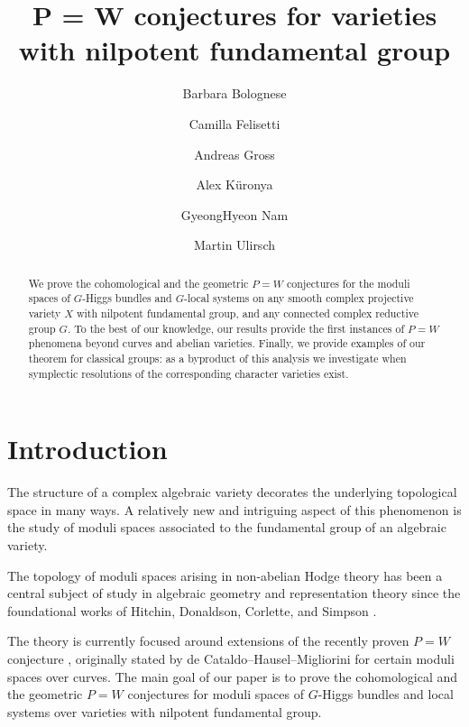 \documentclass[11pt, a4paper]{amsart}
\title{P = W conjectures for varieties with nilpotent fundamental group}
\date{}
\author{Barbara Bolognese}
\author{Camilla Felisetti}
\author{Andreas Gross}
\author{Alex K\"uronya}
\author{GyeongHyeon Nam}
\author{Martin Ulirsch}
\theoremstyle{definition}
\theoremstyle{myitemstyle}
\begin{document}
\begin{abstract}
 We prove the cohomological and the geometric $P=W$ conjectures for the moduli spaces of $G$-Higgs bundles and $G$-local systems on any smooth complex projective variety $X$ with nilpotent fundamental group, and any connected complex reductive group $G$.
To the best of our knowledge, our results provide the first instances of $P=W$ phenomena beyond curves and abelian varieties. 
Finally, we provide examples of our theorem for classical groups: as a byproduct of this analysis we investigate when symplectic resolutions of the corresponding character varieties  exist.
\end{abstract}

\maketitle


\setcounter{tocdepth}{1}
\tableofcontents

\section*{Introduction}
\renewcommand{\thetheorem}{\Alph{theorem}}

The structure of a complex algebraic variety decorates  the underlying topological space in many ways. A relatively new and intriguing aspect of this phenomenon is  the study of moduli spaces associated to the fundamental group of an algebraic variety. 

The topology of moduli spaces arising in non-abelian Hodge theory has been a central subject of study in algebraic geometry and representation theory since the foundational works of Hitchin, Donaldson, Corlette, and Simpson \cite{Cor88, Don87, Hit87, Simpson_nonabelianHodge, SimI, SimII}.

The theory is currently focused around extensions of the recently proven $P=W$ conjecture \cite{dCHM_Hilbert,dCHM_P=Wn=2, dCMS22, MS22, HMMS22, MSY25,FM22}, originally stated by de Cataldo--Hausel--Migliorini for certain moduli spaces over curves.  The main goal of our paper is to prove the cohomological and the geometric $P=W$ conjectures for moduli spaces of $G$-Higgs bundles and local systems over varieties with nilpotent fundamental group. 
\end{document}
